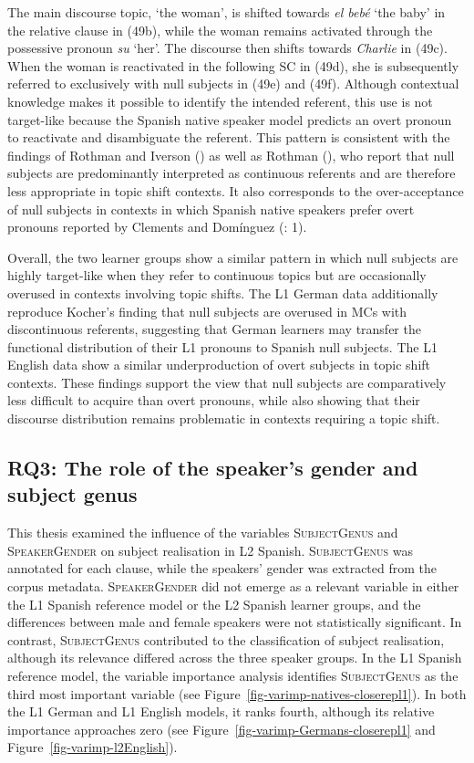 \documentclass[
  letterpaper,
  DIV=11,
  numbers=noendperiod]{scrartcl}
\begin{document}
The main discourse topic, `the woman', is shifted towards \emph{el bebé}
`the baby' in the relative clause in (49b), while the woman remains
activated through the possessive pronoun \emph{su} `her'. The discourse
then shifts towards \emph{Charlie} in (49c). When the woman is
reactivated in the following SC in (49d), she is subsequently referred
to exclusively with null subjects in (49e) and (49f). Although
contextual knowledge makes it possible to identify the intended
referent, this use is not target-like because the Spanish native speaker
model predicts an overt pronoun to reactivate and disambiguate the
referent. This pattern is consistent with the findings of Rothman and
Iverson () as well as Rothman
(), who report that null
subjects are predominantly interpreted as continuous referents and are
therefore less appropriate in topic shift contexts. It also corresponds
to the over-acceptance of null subjects in contexts in which Spanish
native speakers prefer overt pronouns reported by Clements and Domínguez
(: 1).

Overall, the two learner groups show a similar pattern in which null
subjects are highly target-like when they refer to continuous topics but
are occasionally overused in contexts involving topic shifts. The L1
German data additionally reproduce Kocher's finding that null subjects
are overused in MCs with discontinuous referents, suggesting that German
learners may transfer the functional distribution of their L1 pronouns
to Spanish null subjects. The L1 English data show a similar
underproduction of overt subjects in topic shift contexts. These
findings support the view that null subjects are comparatively less
difficult to acquire than overt pronouns, while also showing that their
discourse distribution remains problematic in contexts requiring a topic
shift.

\subsection{RQ3: The role of the speaker's gender and subject
genus}\label{sec-GenderGenus}

This thesis examined the influence of the variables
\textsc{SubjectGenus} and \textsc{SpeakerGender} on subject realisation
in L2 Spanish. \textsc{SubjectGenus} was annotated for each clause,
while the speakers' gender was extracted from the corpus metadata.
\textsc{SpeakerGender} did not emerge as a relevant variable in either
the L1 Spanish reference model or the L2 Spanish learner groups, and the
differences between male and female speakers were not statistically
significant. In contrast, \textsc{SubjectGenus} contributed to the
classification of subject realisation, although its relevance differed
across the three speaker groups. In the L1 Spanish reference model, the
variable importance analysis identifies \textsc{SubjectGenus} as the
third most important variable (see
Figure~\ref{fig-varimp-natives-closerepl1}). In both the L1 German and
L1 English models, it ranks fourth, although its relative importance
approaches zero (see Figure~\ref{fig-varimp-Germans-closerepl1} and
Figure~\ref{fig-varimp-l2English}).
\end{document}
